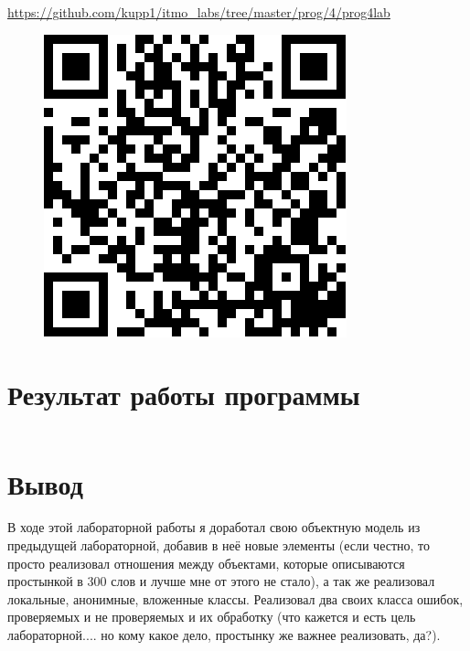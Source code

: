\documentclass[11pt,a4paper]{article}
\begin{document}
     \href{https://github.com/kupp1/itmo_labs/tree/master/prog/4/prog4lab}{https://github.com/kupp1/itmo\_labs/tree/master/prog/4/prog4lab}
     \begin{figure}[H]
     	\centering
     	 \includegraphics[scale=0.3155]{../link.png}
     \end{figure}
 \section{Результат работы программы}
	 \footnotesize
 	\inputminted[linenos=true, breaklines=true]{text}{../out.txt}
 \section{Вывод}
 \normalsize
 В ходе этой лабораторной работы я доработал свою объектную модель из предыдущей лабораторной, добавив в неё новые элементы (если честно, то просто реализовал отношения между объектами, которые описываются простынкой в 300 слов и лучше мне от этого не стало), а так же реализовал локальные, анонимные, вложенные классы. Реализовал два своих класса ошибок, проверяемых и не проверяемых и их обработку (что кажется и есть цель лабораторной.... но кому какое дело, простынку же важнее реализовать, да?).
\end{document}
